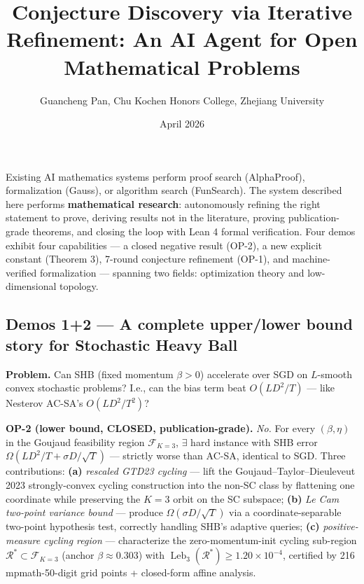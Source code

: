 \documentclass[
  10.5pt,
]{article}
\title{Conjecture Discovery via Iterative Refinement: An AI Agent for
Open Mathematical Problems}
\author{Guancheng Pan, Chu Kochen Honors College, Zhejiang University}
\date{April 2026}
\begin{document}
\maketitle

Existing AI mathematics systems perform proof search (AlphaProof),
formalization (Gauss), or algorithm search (FunSearch). The system
described here performs \textbf{mathematical research}: autonomously
refining the right statement to prove, deriving results not in the
literature, proving publication-grade theorems, and closing the loop
with Lean 4 formal verification. Four demos exhibit four capabilities
--- a closed negative result (OP-2), a new explicit constant (Theorem
3), 7-round conjecture refinement (OP-1), and machine-verified
formalization --- spanning two fields: optimization theory and
low-dimensional topology.

\subsection{Demos 1+2 --- A complete upper/lower bound story for
Stochastic Heavy
Ball}\label{demos-12-a-complete-upperlower-bound-story-for-stochastic-heavy-ball}

\textbf{Problem.} Can SHB (fixed momentum \(\beta>0\)) accelerate over
SGD on \(L\)-smooth convex stochastic problems? I.e., can the bias term
beat \(O(LD^2/T)\) --- like Nesterov AC-SA's \(O(LD^2/T^2)\)?

\textbf{OP-2 (lower bound, CLOSED, publication-grade).} \emph{No.} For
every \((\beta,\eta)\) in the Goujaud feasibility region
\(\mathcal F_{K=3}\), \(\exists\) hard instance with SHB error
\(\Omega(LD^2/T+\sigma D/\sqrt T)\) --- strictly worse than AC-SA,
identical to SGD. Three contributions: \textbf{(a)} \emph{rescaled GTD23
cycling} --- lift the Goujaud--Taylor--Dieuleveut 2023 strongly-convex
cycling construction into the non-SC class by flattening one coordinate
while preserving the \(K{=}3\) orbit on the SC subspace; \textbf{(b)}
\emph{Le Cam two-point variance bound} --- produce
\(\Omega(\sigma D/\sqrt T)\) via a coordinate-separable two-point
hypothesis test, correctly handling SHB's adaptive queries; \textbf{(c)}
\emph{positive-measure cycling region} --- characterize the
zero-momentum-init cycling sub-region
\(\mathcal R^* \subset \mathcal F_{K=3}\) (anchor
\(\beta\!\approx\!0.303\)) with
\(\operatorname{Leb}_3(\mathcal R^*) \ge 1.20\!\times\!10^{-4}\),
certified by 216 mpmath-50-digit grid points + closed-form affine
analysis.
\end{document}
